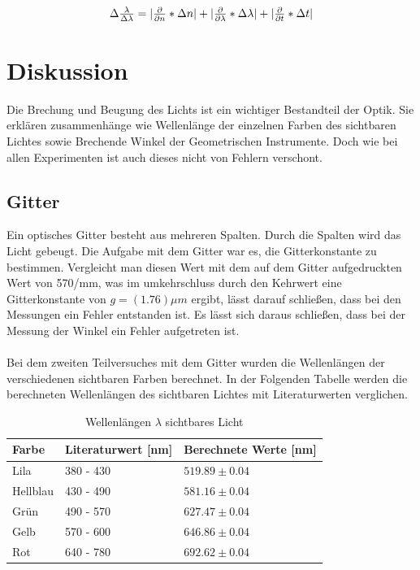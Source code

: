 \documentclass[12pt,a4paper,twoside]{article}
\begin{document}
\begin{equation}
    \label{eq:uns Auflösungsvermögen Prisma}
    \centerline{$ \Delta \frac{\lambda}{\Delta \lambda} = \vert \frac{\partial}{\partial n} * \Delta n \vert + \vert \frac{\partial}{\partial \lambda} * \Delta \lambda \vert + \vert \frac{\partial}{\partial t} * \Delta t \vert$}
\end{equation}

\section{Diskussion} %
Die Brechung und Beugung des Lichts ist ein wichtiger Bestandteil der Optik. Sie erklären zusammenhänge wie Wellenlänge der einzelnen Farben des sichtbaren Lichtes sowie Brechende Winkel der Geometrischen Instrumente. 
Doch wie bei allen Experimenten ist auch dieses nicht von Fehlern verschont. 

\subsection{Gitter}
Ein optisches Gitter besteht aus mehreren Spalten. 
Durch die Spalten wird das Licht gebeugt. 
Die Aufgabe mit dem Gitter war es, die Gitterkonstante zu bestimmen. 
Vergleicht man diesen Wert mit dem auf dem Gitter aufgedruckten Wert von 570/mm, was im umkehrschluss durch den Kehrwert eine Gitterkonstante von $g=(1.76)\mu m$ ergibt, lässt darauf schließen, dass bei den Messungen ein Fehler entstanden ist. 
Es lässt sich daraus schließen, dass bei der Messung der Winkel ein Fehler aufgetreten ist. 
\\
\\
Bei dem zweiten Teilversuches mit dem Gitter wurden die Wellenlängen der verschiedenen sichtbaren Farben berechnet. 
In der Folgenden Tabelle werden die berechneten Wellenlängen des sichtbaren Lichtes mit Literaturwerten verglichen. 

\begin{table}[H]
    \centering
    \caption{Wellenlängen $\lambda$ sichtbares Licht }
    \label{tab:literatur wellenlänge}
    \begin{tabular}{| l | l | l |}
        \hline
        Farbe & Literaturwert \cite{wiki1} [nm] & Berechnete Werte [nm]\\
        \hline
        Lila        & 380 - 430 & $ 519.89 \pm 0.04 $ \\
        Hellblau    & 430 - 490 & $ 581.16 \pm 0.04 $ \\
        Grün        & 490 - 570 & $ 627.47 \pm 0.04 $ \\
        Gelb        & 570 - 600 & $ 646.86 \pm 0.04 $ \\
        Rot         & 640 - 780 & $ 692.62 \pm 0.04 $ \\
        \hline
    \end{tabular}
\end{table}
\end{document}
